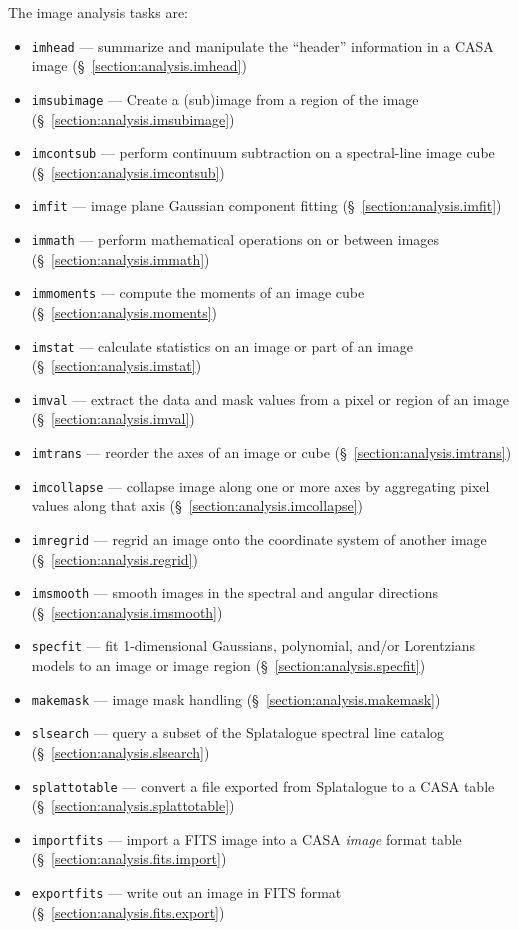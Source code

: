 The image analysis tasks are:
\begin{itemize}
   \item {\tt imhead} --- summarize and manipulate the ``header'' 
         information in a CASA image 
         (\S~\ref{section:analysis.imhead})
   \item {\tt imsubimage} --- Create a (sub)image from a region of the
     image (\S~\ref{section:analysis.imsubimage}) 
   \item {\tt imcontsub} --- perform continuum subtraction on a
         spectral-line image cube 
         (\S~\ref{section:analysis.imcontsub})
   \item {\tt imfit} --- image plane Gaussian component fitting
         (\S~\ref{section:analysis.imfit})
   \item {\tt immath} --- perform mathematical operations on or
         between images
         (\S~\ref{section:analysis.immath})
   \item {\tt immoments} --- compute the moments of an image cube
         (\S~\ref{section:analysis.moments})
   \item {\tt imstat} --- calculate statistics on an image or part
         of an image
         (\S~\ref{section:analysis.imstat})
   \item {\tt imval} --- extract the data and mask values from a
         pixel or region of an image
         (\S~\ref{section:analysis.imval})
  \item {\tt imtrans} --- reorder the axes of an image or cube
         (\S~\ref{section:analysis.imtrans})
  \item {\tt imcollapse} --- collapse image along one or more axes by aggregating pixel values along that axis 
         (\S~\ref{section:analysis.imcollapse})
   \item {\tt imregrid} --- regrid an image onto the coordinate
         system of another image 
         (\S~\ref{section:analysis.regrid})
   \item {\tt imsmooth} --- smooth images in the spectral and angular
     directions
         (\S~\ref{section:analysis.imsmooth})
   \item{\tt specfit} --- fit 1-dimensional Gaussians, 
     polynomial, and/or Lorentzians models to an image or image region 
        (\S~\ref{section:analysis.specfit})
    \item {\tt makemask} --- image mask handling
         (\S~\ref{section:analysis.makemask})
  \item{\tt slsearch} --- query a subset of the Splatalogue spectral
line catalog
          (\S~\ref{section:analysis.slsearch})
  \item{\tt splattotable} --- convert a file exported from Splatalogue
to a CASA table 
          (\S~\ref{section:analysis.splattotable})
   \item {\tt importfits} --- import a FITS image into a CASA  
         {\it image} format table 
         (\S~\ref{section:analysis.fits.import})
   \item {\tt exportfits} --- write out an image in FITS format
         (\S~\ref{section:analysis.fits.export})
\end{itemize}

